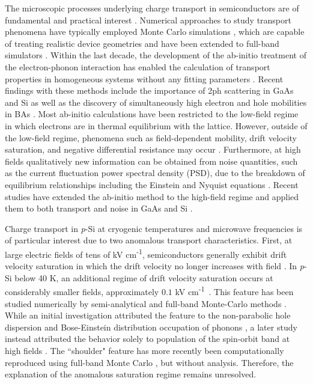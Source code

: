 \documentclass[aps,prx,preprint,letterpaper,groupedaddress,longbibliography]{revtex4-2}
\theoremstyle{definition}
\newcommand{\eunits}{kV cm\textsuperscript{-1}}
\begin{document}
The microscopic processes underlying charge transport in semiconductors are of fundamental and practical interest \cite{Lundstrom:2000,Ferry:2000,Ponce:2020,Bernardi:2016,Giustino:2017}. Numerical approaches to study transport phenomena have typically employed Monte Carlo simulations \cite{Lundstrom:2000}, which are capable of treating realistic device geometries \cite{jacoboni:1989,Mateos:2000} and have been extended to full-band simulators \cite{Hess:1991,Jungemann:1999}. Within the last decade, the development of the ab-initio treatment of the electron-phonon interaction has enabled the calculation of transport properties in homogeneous systems without any fitting parameters \cite{Bernardi:2016,Giustino:2017}. Recent findings with these methods include the importance of 2ph scattering in GaAs \cite{Lee:2020, Cheng:2022} and Si \cite{Ben:2022} as well as the discovery of simultaneously high electron and hole mobilities in BAs \cite{Liu:2018,Shin:2022,Yue:2022}. Most ab-initio calculations have been restricted to the low-field regime in which electrons are in thermal equilibrium with the lattice. However, outside of the low-field regime, phenomena such as field-dependent mobility, drift velocity saturation, and negative differential resistance may occur \cite{Jacoboni:1979,Ottaviani:1975,Canali:1975}. Furthermore, at high fields qualitatively new information can be obtained from noise quantities, such as the current fluctuation power spectral density (PSD), due to the breakdown of equilibrium relationships including the Einstein \cite{Reggiani:1985_2} and Nyquist equations \cite{Nougier:1980}. Recent studies have extended the ab-initio method to the high-field regime and applied them to both transport and noise in GaAs \cite{Choi:2021,Cheng:2022} and Si \cite{Catherall:2022,Ben:2022}.

Charge transport in \textit{p}-Si at cryogenic temperatures and microwave frequencies is of particular interest due to two anomalous transport characteristics. First, at large electric fields of tens of \eunits, semiconductors generally exhibit drift velocity saturation in which the drift velocity no longer increases with field \cite{Lundstrom:2000}. In \textit{p}-Si below 40 K, an additional regime of drift velocity saturation occurs at considerably smaller fields, approximately $0.1$ \eunits~\cite{Ottaviani:1975}. This feature has been studied numerically by semi-analytical \cite{VonB:1976,Ohno:1988} and full-band Monte-Carlo methods \cite{Fischer:2000}. While an initial investigation attributed the feature to the non-parabolic hole dispersion and Bose-Einstein distribution occupation of phonons \cite{VonB:1976}, a later study instead attributed the behavior solely to population of the spin-orbit band at high fields \cite{Ohno:1988}. The ``shoulder" feature has more recently been computationally reproduced using full-band Monte Carlo \cite{Fischer:2000}, but without analysis. Therefore, the explanation of the anomalous saturation regime remains unresolved.\par
\end{document}
